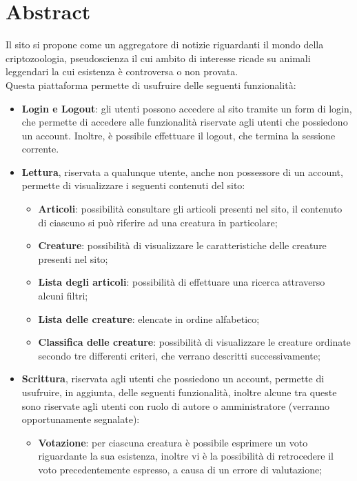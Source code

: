 \section{Abstract}
\label{sec:abstract}
Il sito si propone come un aggregatore di notizie riguardanti il mondo della criptozoologia, pseudoscienza il cui ambito di interesse ricade su animali leggendari la cui esistenza è controversa o non provata. \\
Questa piattaforma permette di usufruire delle seguenti funzionalità:
\begin{itemize}
    \item \textbf{Login e Logout}: gli utenti possono accedere al sito tramite un form di login, che permette di accedere alle funzionalità riservate agli utenti che possiedono un account. Inoltre, è possibile effettuare il logout, che termina la sessione corrente.
    \item \textbf{Lettura}, riservata a qualunque utente, anche non possessore di un account, permette di visualizzare i seguenti contenuti del sito:
    \begin{itemize}
        \item \textbf{Articoli}: possibilità consultare gli articoli presenti nel sito, il contenuto di ciascuno si può riferire ad una creatura in particolare;
        \item \textbf{Creature}: possibilità di visualizzare le caratteristiche delle creature presenti nel sito;
        \item \textbf{Lista degli articoli}: possibilità di effettuare una ricerca attraverso alcuni filtri;
        \item \textbf{Lista delle creature}: elencate in ordine alfabetico;
        \item \textbf{Classifica delle creature}: possibilità di visualizzare le creature ordinate secondo tre differenti criteri, che verrano descritti successivamente;
    \end{itemize}
    \item \textbf{Scrittura}, riservata agli utenti che possiedono un account, permette di usufruire, in aggiunta, delle seguenti funzionalità, inoltre alcune tra queste sono riservate agli utenti con ruolo di autore o amministratore (verranno opportunamente segnalate):
    \begin{itemize}
        \item \textbf{Votazione}: per ciascuna creatura è possibile esprimere un voto riguardante la sua esistenza, inoltre vi è la possibilità di retrocedere il voto precedentemente espresso, a causa di un errore di valutazione;

\end{itemize}
\end{itemize}
